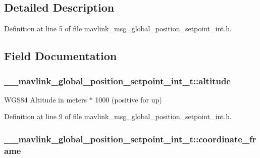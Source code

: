 \subsection{Detailed Description}


Definition at line 5 of file mavlink\-\_\-msg\-\_\-global\-\_\-position\-\_\-setpoint\-\_\-int.\-h.



\subsection{Field Documentation}
\hypertarget{struct____mavlink__global__position__setpoint__int__t_a73aa1270e7a36b8b86857221366b5a4d}{
\subsubsection[{altitude}]{ \-\_\-\-\_\-mavlink\-\_\-global\-\_\-position\-\_\-setpoint\-\_\-int\-\_\-t\-::altitude}}\label{struct____mavlink__global__position__setpoint__int__t_a73aa1270e7a36b8b86857221366b5a4d}


W\-G\-S84 Altitude in meters $\ast$ 1000 (positive for up) 



Definition at line 9 of file mavlink\-\_\-msg\-\_\-global\-\_\-position\-\_\-setpoint\-\_\-int.\-h.

\hypertarget{struct____mavlink__global__position__setpoint__int__t_aca893671888c2856ff4e8d67a267d3ac}{
\subsubsection[{coordinate\-\_\-frame}]{ \-\_\-\-\_\-mavlink\-\_\-global\-\_\-position\-\_\-setpoint\-\_\-int\-\_\-t\-::coordinate\-\_\-frame}}\label{struct____mavlink__global__position__setpoint__int__t_aca893671888c2856ff4e8d67a267d3ac}


